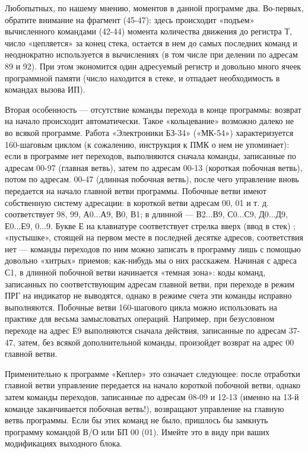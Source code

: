 \documentclass[11pt,a4paper,oneside]{article}
\begin{document}
Любопытных, по нашему мнению, моментов в данной программе два. Во-первых, обратите внимание на фрагмент (45-47): здесь происходит «подъем» вычисленного командами (42-44) момента количества движения до регистра Т, число «цепляется» за конец стека, остается в нем до самых последних команд и неоднократно используется в вычислениях (в том числе при делении по адресам 89 и 92). При этом экономится один адресуемый регистр и довольно много ячеек программной памяти (число находится в стеке, и отпадает необходимость в командах вызова ИП).

Вторая особенность — отсутствие команды перехода в конце программы: возврат на начало происходит автоматически. Такое «кольцевание» возможно далеко не во всякой программе. Работа «Электроники БЗ-34» («МК-54») характеризуется 160-шаговым циклом (к сожалению, инструкция к ПМК о нем не упоминает): если в программе нет переходов, выполняются сначала команды, записанные по адресам 00-97 (главная ветвь), затем по адресам 00-13 (короткая побочная ветвь), потом по адресам. 00-47 (длинная побочная ветвь), после чего управление вновь передается на начало главной ветви программы. Побочные ветви имеют собственную систему адресации: в короткой ветви адресам 00, 01 и т. д. соответствует 98, 99, А0...А9, В0, В1; в длинной — В2...В9, С0...С9, Д0...Д9, Е0...Е9, 0...9. Букве Е на клавиатуре соответствует стрелка вверх (ввод в стек) ; «пустышке», стоящей на первом месте в последней десятке адресов, соответствия нет — команды переходов по ним можно записать в программу лишь с помощью довольно «хитрых» приемов; как-нибудь мы о них расскажем. Начиная с адреса С1, в длинной побочной ветви начинается «темная зона»: коды команд, записанных по соответствующим адресам главной ветви, при переходе в режим ПРГ на индикатор не выводятся, однако в режиме счета эти команды исправно выполняются. Побочные ветви 160-шагового цикла можно использовать на практике для весьма замысловатых операций. Например, при безусловном переходе на адрес Е9 выполняются сначала действия, записанные по адресам 37-47, затем, без всякой дополнительной команды, произойдет возврат на адрес 00 главной ветви.

Применительно к программе «Кеплер» это означает следующее: после отработки главной ветви управление передается на начало короткой побочной ветви, однако затем команды переходов, записанные по адресам 08-09 и 12-13 (именно на 13-й команде заканчивается побочная ветвь!), возвращают управление на главную ветвь программы. Если бы этих команд не было, пришлось бы замкнуть программу командой В/О или БП 00 (01). Имейте это в виду при ваших модификациях выходного блока.
\end{document}
